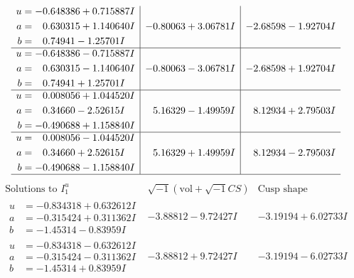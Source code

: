 \documentclass[1p]{elsarticle_modified}
\theoremstyle{definition}
\newcommand{\I}{\sqrt{-1}}
\begin{document}
$$\begin{array}{c|c|c}
\begin{aligned}
u &= -0.648386 + 0.715887 I \\
a &= \phantom{-}0.630315 + 1.140640 I \\
b &= \phantom{-}0.74941 - 1.25701 I\end{aligned}
 & -0.80063 + 3.06781 I & -2.68598 - 1.92704 I \\ \hline\begin{aligned}
u &= -0.648386 - 0.715887 I \\
a &= \phantom{-}0.630315 - 1.140640 I \\
b &= \phantom{-}0.74941 + 1.25701 I\end{aligned}
 & -0.80063 - 3.06781 I & -2.68598 + 1.92704 I \\ \hline\begin{aligned}
u &= \phantom{-}0.008056 + 1.044520 I \\
a &= \phantom{-}0.34660 - 2.52615 I \\
b &= -0.490688 + 1.158840 I\end{aligned}
 & \phantom{-}5.16329 - 1.49959 I & \phantom{-}8.12934 + 2.79503 I \\ \hline\begin{aligned}
u &= \phantom{-}0.008056 - 1.044520 I \\
a &= \phantom{-}0.34660 + 2.52615 I \\
b &= -0.490688 - 1.158840 I\end{aligned}
 & \phantom{-}5.16329 + 1.49959 I & \phantom{-}8.12934 - 2.79503 I\\
 \hline 
 \end{array}$$\newpage$$\begin{array}{c|c|c}  
\text{Solutions to }I^u_{1}& \I (\text{vol} + \sqrt{-1}CS) & \text{Cusp shape}\\
 \hline 
\begin{aligned}
u &= -0.834318 + 0.632612 I \\
a &= -0.315424 + 0.311362 I \\
b &= -1.45314 - 0.83959 I\end{aligned}
 & -3.88812 - 9.72427 I & -3.19194 + 6.02733 I \\ \hline\begin{aligned}
u &= -0.834318 - 0.632612 I \\
a &= -0.315424 - 0.311362 I \\
b &= -1.45314 + 0.83959 I\end{aligned}
 & -3.88812 + 9.72427 I & -3.19194 - 6.02733 I \\ \hline\begin{aligned}

\end{aligned}
\end{array}$$
\end{document}
